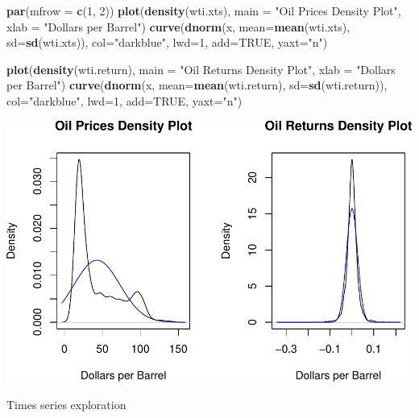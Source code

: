 \documentclass[11pt,]{article}
\makeatletter
\newenvironment{Shaded}{\begin{snugshade}}{\end{snugshade}}
\newcommand{\KeywordTok}[1]{\textcolor[rgb]{0.13,0.29,0.53}{\textbf{{#1}}}}
\newcommand{\DataTypeTok}[1]{\textcolor[rgb]{0.13,0.29,0.53}{{#1}}}
\newcommand{\DecValTok}[1]{\textcolor[rgb]{0.00,0.00,0.81}{{#1}}}
\newcommand{\StringTok}[1]{\textcolor[rgb]{0.31,0.60,0.02}{{#1}}}
\newcommand{\OtherTok}[1]{\textcolor[rgb]{0.56,0.35,0.01}{{#1}}}
\newcommand{\NormalTok}[1]{{#1}}
\def\maxwidth{\ifdim\Gin@nat@width>\linewidth\linewidth
\else\Gin@nat@width\fi}
\let\Oldincludegraphics\includegraphics
\renewcommand{\includegraphics}[1]{\Oldincludegraphics[width=\maxwidth]{#1}}
\makeatother
\begin{document}
\begin{Shaded}
\begin{Highlighting}[]
\KeywordTok{par}\NormalTok{(}\DataTypeTok{mfrow =} \KeywordTok{c}\NormalTok{(}\DecValTok{1}\NormalTok{, }\DecValTok{2}\NormalTok{))}
\KeywordTok{plot}\NormalTok{(}\KeywordTok{density}\NormalTok{(wti.xts), }\DataTypeTok{main =} \StringTok{"Oil Prices Density Plot"}\NormalTok{, }\DataTypeTok{xlab =} \StringTok{"Dollars per Barrel"}\NormalTok{)}
\KeywordTok{curve}\NormalTok{(}\KeywordTok{dnorm}\NormalTok{(x, }\DataTypeTok{mean=}\KeywordTok{mean}\NormalTok{(wti.xts), }\DataTypeTok{sd=}\KeywordTok{sd}\NormalTok{(wti.xts)), }
          \DataTypeTok{col=}\StringTok{"darkblue"}\NormalTok{, }\DataTypeTok{lwd=}\DecValTok{1}\NormalTok{, }\DataTypeTok{add=}\OtherTok{TRUE}\NormalTok{, }\DataTypeTok{yaxt=}\StringTok{"n"}\NormalTok{)}

\KeywordTok{plot}\NormalTok{(}\KeywordTok{density}\NormalTok{(wti.return), }\DataTypeTok{main =} \StringTok{"Oil Returns Density Plot"}\NormalTok{, }\DataTypeTok{xlab =} \StringTok{"Dollars per Barrel"}\NormalTok{)}
\KeywordTok{curve}\NormalTok{(}\KeywordTok{dnorm}\NormalTok{(x, }\DataTypeTok{mean=}\KeywordTok{mean}\NormalTok{(wti.return), }\DataTypeTok{sd=}\KeywordTok{sd}\NormalTok{(wti.return)), }
          \DataTypeTok{col=}\StringTok{"darkblue"}\NormalTok{, }\DataTypeTok{lwd=}\DecValTok{1}\NormalTok{, }\DataTypeTok{add=}\OtherTok{TRUE}\NormalTok{, }\DataTypeTok{yaxt=}\StringTok{"n"}\NormalTok{)}
\end{Highlighting}
\end{Shaded}

\includegraphics{JHamski_manuscript_files/figure-latex/unnamed-chunk-5-1.pdf}

Times series exploration
\end{document}
